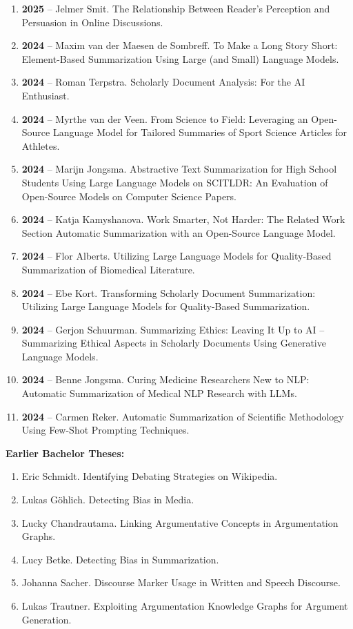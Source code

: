 \begin{enumerate}
\item \textbf{2025} -- Jelmer Smit. The Relationship Between Reader's Perception and Persuasion in Online Discussions.
\item \textbf{2024} -- Maxim van der Maesen de Sombreff. To Make a Long Story Short: Element-Based Summarization Using Large (and Small) Language Models.
\item \textbf{2024} -- Roman Terpstra. Scholarly Document Analysis: For the AI Enthusiast.
\item \textbf{2024} -- Myrthe van der Veen. From Science to Field: Leveraging an Open-Source Language Model for Tailored Summaries of Sport Science Articles for Athletes.
\item \textbf{2024} -- Marijn Jongsma. Abstractive Text Summarization for High School Students Using Large Language Models on SCITLDR: An Evaluation of Open-Source Models on Computer Science Papers.
\item \textbf{2024} -- Katja Kamyshanova. Work Smarter, Not Harder: The Related Work Section Automatic Summarization with an Open-Source Language Model.
\item \textbf{2024} -- Flor Alberts. Utilizing Large Language Models for Quality-Based Summarization of Biomedical Literature.
\item \textbf{2024} -- Ebe Kort. Transforming Scholarly Document Summarization: Utilizing Large Language Models for Quality-Based Summarization.
\item \textbf{2024} -- Gerjon Schuurman. Summarizing Ethics: Leaving It Up to AI -- Summarizing Ethical Aspects in Scholarly Documents Using Generative Language Models.
\item \textbf{2024} -- Benne Jongsma. Curing Medicine Researchers New to NLP: Automatic Summarization of Medical NLP Research with LLMs.
\item \textbf{2024} -- Carmen Reker. Automatic Summarization of Scientific Methodology Using Few-Shot Prompting Techniques.
\end{enumerate}

\textbf{Earlier Bachelor Theses:}
\begin{enumerate}
\item Eric Schmidt. Identifying Debating Strategies on Wikipedia.
\item Lukas Göhlich. Detecting Bias in Media.
\item Lucky Chandrautama. Linking Argumentative Concepts in Argumentation Graphs.
\item Lucy Betke. Detecting Bias in Summarization.
\item Johanna Sacher. Discourse Marker Usage in Written and Speech Discourse.
\item Lukas Trautner. Exploiting Argumentation Knowledge Graphs for Argument Generation.
\end{enumerate}


